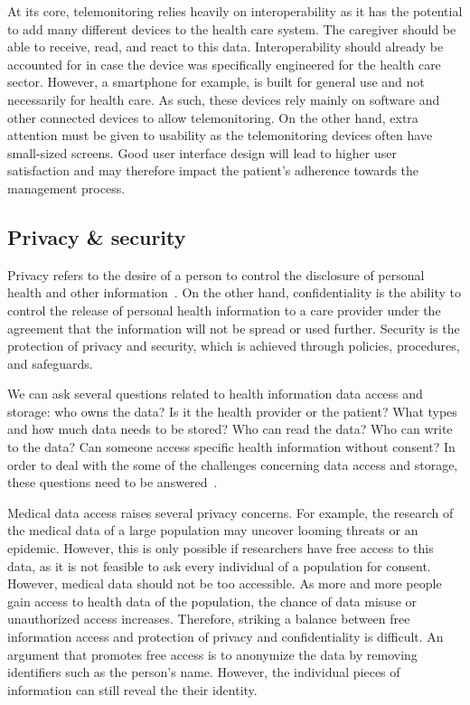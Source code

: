     At its core, telemonitoring relies heavily on interoperability as it has the potential to add many different devices to the health care system. The caregiver should be able to receive, read, and react to this data. Interoperability should already be accounted for in case the device was specifically engineered for the health care sector. However, a smartphone for example, is built for general use and not necessarily for health care. As such, these devices rely mainly on software and other connected devices to allow telemonitoring. On the other hand, extra attention must be given to usability as the telemonitoring devices often have small-sized screens. Good user interface design will lead to higher user satisfaction and may therefore impact the patient's adherence towards the management process.

    \subsection{Privacy \& security}\label{privacy}

    Privacy refers to the desire of a person to control the disclosure of personal health and other information~\cite{Shortliffe2014}. On the other hand, confidentiality is the ability to control the release of personal health information to a care provider under the agreement that the information will not be spread or used further. Security is the protection of privacy and security, which is achieved through policies, procedures, and safeguards. 

    We can ask several questions related to health information data access and storage: who owns the data? Is it the health provider or the patient? What types and how much data needs to be stored? Who can read the data? Who can write to the data? Can someone access specific health information without consent? In order to deal with the some of the challenges concerning data access and storage, these questions need to be answered~\cite{Meingast2006}.

    Medical data access raises several privacy concerns. For example, the research of the medical data of a large population may uncover looming threats or an epidemic. However, this is only possible if researchers have free access to this data, as it is not feasible to ask every individual of a population for consent. However, medical data should not be too accessible. As more and more people gain access to health data of the population, the chance of data misuse or unauthorized access increases. Therefore, striking a balance between free information access and protection of privacy and confidentiality is difficult. An argument that promotes free access is to anonymize the data by removing identifiers such as the person's name. However, the individual pieces of information can still reveal the their identity.

